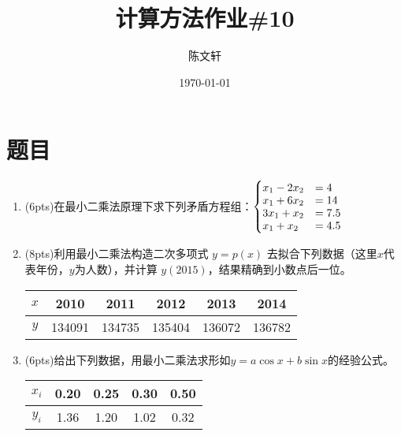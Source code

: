 \documentclass[cn,hazy,green,11pt,normal]{elegantnote}
\title{计算方法作业\#10}
\author{陈文轩}
\institute{KFRC}
\date{\today}
\begin{document}
\maketitle

\section{题目}


    \begin{enumerate}

    \item (6pts)在最小二乘法原理下求下列矛盾方程组：$\begin{cases}x_1-2x_2&=4\vspace{-0.1cm}\\x_1+6x_2&=14\vspace{-0.1cm}\\3x_1+x_2&=7.5\vspace{-0.1cm}\\x_1+x_2&=4.5\end{cases}$

    \item (8pts)利用最小二乘法构造二次多项式 $y=p(x)$ 去拟合下列数据（这里$x$代表年份，$y$为人数），并计算 $y(2015)$，结果精确到小数点后一位。

        \begin{table}[H]
            \centering
            \begin{tabular}{|c|c|c|c|c|c|}
                \hline
                $x$ & 2010 & 2011 & 2012 & 2013 & 2014 \\
                \hline
                $y$ & 134091 & 134735 & 135404 & 136072 & 136782 \\
                \hline
            \end{tabular}
            \label{tab:1}
        \end{table}


    \item (6pts)给出下列数据，用最小二乘法求形如$y=a\cos x+b\sin x$的经验公式。

        \begin{table}[H]
            \centering
            \begin{tabular}{|c|c|c|c|c|}
                \hline
                $x_i$ & 0.20 & 0.25 & 0.30 & 0.50 \\
                \hline
                $y_i$ & 1.36 & 1.20 & 1.02 & 0.32 \\
                \hline
            \end{tabular}
            \label{tab:2}
        \end{table}



\end{enumerate}
\end{document}
